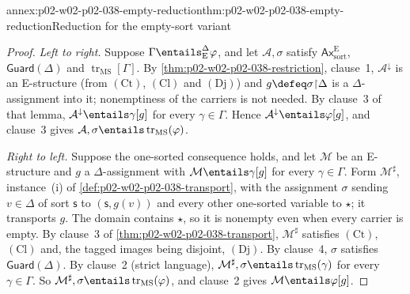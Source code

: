 \begin{annexitem}{annex:p02-w02-p02-038-empty-reduction}{thm:p02-w02-p02-038-empty-reduction}{Reduction for the empty-sort variant}
\begin{proof}
\emph{Left to right.}  Suppose \(\Gamma\entails^{\Delta}_{\mathrm E}\varphi\),
and let \(\mathcal A,\sigma\) satisfy \(\mathsf{Ax}^{\mathrm E}_{\mathrm{sort}}\),
\(\mathsf{Guard}(\Delta)\) and \(\operatorname{tr}_{\mathrm{MS}}[\Gamma]\).
By \cref{thm:p02-w02-p02-038-restriction}, clause~1, \(\mathcal A^{\downarrow}\)
is an E-structure (from \((\mathrm{Ct})\), \((\mathrm{Cl})\) and
\((\mathrm{Dj})\)) and \(g\defeq\sigma{\restriction}\Delta\) is a
\(\Delta\)-assignment into it; nonemptiness of the carriers is not needed.
By clause~3 of that lemma, \(\mathcal A^{\downarrow}\entails\gamma[g]\) for
every \(\gamma\in\Gamma\).  Hence \(\mathcal A^{\downarrow}\entails\varphi[g]\),
and clause~3 gives
\(\mathcal A,\sigma\entails\operatorname{tr}_{\mathrm{MS}}(\varphi)\).

\emph{Right to left.}  Suppose the one-sorted consequence holds, and let
\(\mathcal M\) be an E-structure and \(g\) a \(\Delta\)-assignment with
\(\mathcal M\entails\gamma[g]\) for every \(\gamma\in\Gamma\).  Form
\(\mathcal M^{\sharp}\), instance~(i) of \cref{def:p02-w02-p02-038-transport},
with the assignment \(\sigma\) sending \(v\in\Delta\) of sort \(\mathsf s\) to
\((\mathsf s,g(v))\) and every other one-sorted variable to \(\star\); it
transports \(g\).  The domain contains \(\star\), so it is nonempty even when
every carrier is empty.  By clause~3 of \cref{thm:p02-w02-p02-038-transport},
\(\mathcal M^{\sharp}\) satisfies \((\mathrm{Ct})\), \((\mathrm{Cl})\) and,
the tagged images being disjoint, \((\mathrm{Dj})\).  By clause~4,
\(\sigma\) satisfies \(\mathsf{Guard}(\Delta)\).  By clause~2 (strict
language), \(\mathcal M^{\sharp},\sigma\entails
\operatorname{tr}_{\mathrm{MS}}(\gamma)\) for every \(\gamma\in\Gamma\).  So
\(\mathcal M^{\sharp},\sigma\entails\operatorname{tr}_{\mathrm{MS}}(\varphi)\),
and clause~2 gives \(\mathcal M\entails\varphi[g]\).
\end{proof}
\end{annexitem}

